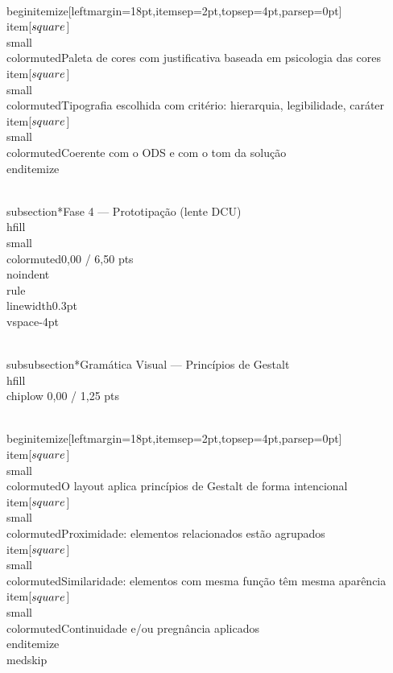 \documentclass[11pt, a4paper]{article}
\newcommand{\chiplow}[1]{\colorbox{crimsondim}{\color{crimson}\semibold\small\strut\ #1\ }}
\begin{document}
\\begin{itemize}[leftmargin=18pt,itemsep=2pt,topsep=4pt,parsep=0pt]
  \\item[$\\square$] {\\small\\color{muted}Paleta de cores com justificativa baseada em psicologia das cores}
  \\item[$\\square$] {\\small\\color{muted}Tipografia escolhida com critério: hierarquia, legibilidade, caráter}
  \\item[$\\square$] {\\small\\color{muted}Coerente com o ODS e com o tom da solução}
\\end{itemize}

\\subsection*{Fase 4 — Prototipação (lente DCU) \\hfill {\\small\\color{muted}0,00 / 6,50 pts}}
\\noindent\\rule{\\linewidth}{0.3pt}\\vspace{-4pt}

\\subsubsection*{Gramática Visual — Princípios de Gestalt \\hfill {\\chiplow 0,00 / 1,25 pts}}

\\begin{itemize}[leftmargin=18pt,itemsep=2pt,topsep=4pt,parsep=0pt]
  \\item[$\\square$] {\\small\\color{muted}O layout aplica princípios de Gestalt de forma intencional}
  \\item[$\\square$] {\\small\\color{muted}Proximidade: elementos relacionados estão agrupados}
  \\item[$\\square$] {\\small\\color{muted}Similaridade: elementos com mesma função têm mesma aparência}
  \\item[$\\square$] {\\small\\color{muted}Continuidade e/ou pregnância aplicados}
\\end{itemize}
\\medskip
\end{document}
